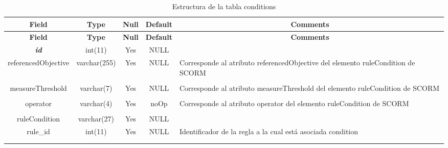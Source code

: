 %
%
\begin{longtable}{c c c c l}
	\multicolumn{1}{c}{\textbf{Field}} &
	\multicolumn{1}{c}{\textbf{Type}} &
	\multicolumn{1}{c}{\textbf{Null}} &
	\multicolumn{1}{c}{\textbf{Default}} &
	\multicolumn{1}{c}{\textbf{Comments}} \\ \hline \hline
\endfirsthead
	\multicolumn{1}{c}{\textbf{Field}} &
	\multicolumn{1}{c}{\textbf{Type}} &
	\multicolumn{1}{c}{\textbf{Null}} &
	\multicolumn{1}{c}{\textbf{Default}} &
	\multicolumn{1}{c}{\textbf{Comments}} \\ \hline \hline
\endhead \endfoot
	\textbf{\textit{id}} & int(11) & Yes & NULL\\ \hline 
	referencedObjective & varchar(255) & Yes & NULL & \parbox[t]{0.35\textwidth}{Corresponde al atributo referencedObjective del elemento ruleCondition de SCORM} \\ \\  \hline
	measureThreshold & varchar(7) & Yes & NULL & \parbox[t]{0.35\textwidth}{Corresponde al atributo measureThreshold del elemento ruleCondition de SCORM} \\ \\  \hline
	operator & varchar(4) & Yes & noOp & \parbox[t]{0.35\textwidth}{Corresponde al atributo operator del elemento ruleCondition de SCORM} \\ \\  \hline
	ruleCondition & varchar(27) & Yes & NULL \\ \hline 
	rule\_id & int(11) & Yes & NULL & \parbox[t]{0.35\textwidth}{Identificador de la regla a la cual está asociada condition}\\ \\ 
\caption{Estructura de la tabla conditions} \label{tab:scorm_conditions-structure} \\
\end{longtable}

